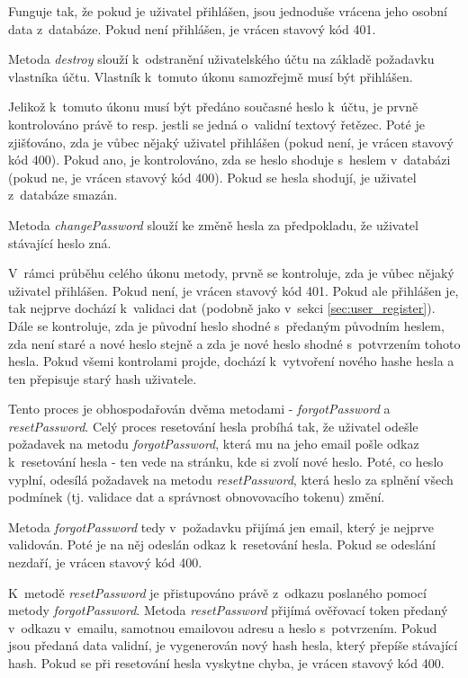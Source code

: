 			Funguje tak, že pokud je uživatel přihlášen, jsou jednoduše vrácena jeho osobní data z~databáze. Pokud není přihlášen, je vrácen stavový kód 401.
			
			\label{sec:user_destroy}
			Metoda \textit{destroy} slouží k~odstranění uživatelského účtu na základě požadavku vlastníka účtu. Vlastník k~tomuto úkonu samozřejmě musí být přihlášen.
			
			Jelikož k~tomuto úkonu musí být předáno současné heslo k~účtu, je prvně kontrolováno právě to resp. jestli se jedná o~validní textový řetězec. Poté je zjišťováno, zda je vůbec nějaký uživatel přihlášen (pokud není, je vrácen stavový kód 400). Pokud ano, je kontrolováno, zda se heslo shoduje s~heslem v~databázi (pokud ne, je vrácen stavový kód 400). Pokud se hesla shodují, je uživatel z~databáze smazán.
			
			\label{sec:user_changepassword}
			Metoda \textit{changePassword} slouží ke změně hesla za předpokladu, že uživatel stávající heslo zná.
			
			V~rámci průběhu celého úkonu metody, prvně se kontroluje, zda je vůbec nějaký uživatel přihlášen. Pokud není, je vrácen stavový kód 401. Pokud ale přihlášen je, tak nejprve dochází k~validaci dat (podobně jako v~sekci \ref{sec:user_register}). Dále se kontroluje, zda je původní heslo shodné s~předaným původním heslem, zda není staré a nové heslo stejně a zda je nové heslo shodné s~potvrzením tohoto hesla. Pokud všemi kontrolami projde, dochází k~vytvoření nového hashe hesla a ten přepisuje starý hash uživatele.
			
			 \label{sec:user_reset_forgot_password}
			Tento proces je obhospodařován dvěma metodami - \textit{forgotPassword} a \textit{resetPassword}. Celý proces resetování hesla probíhá tak, že uživatel odešle požadavek na metodu \textit{forgotPassword}, která mu na jeho email pošle odkaz k~resetování hesla - ten vede na stránku, kde si zvolí nové heslo. Poté, co heslo vyplní, odesílá požadavek na metodu \textit{resetPassword}, která heslo za splnění všech podmínek (tj. validace dat a správnost obnovovacího tokenu) změní. 
			
			Metoda \textit{forgotPassword} tedy v~požadavku přijímá jen email, který je nejprve validován. Poté je na něj odeslán odkaz k~resetování hesla. Pokud se odeslání nezdaří, je vrácen stavový kód 400.
			
			K~metodě \textit{resetPassword} je přistupováno právě z~odkazu poslaného pomocí metody \textit{forgotPassword}. Metoda \textit{resetPassword} přijímá ověřovací token předaný v~odkazu v~emailu, samotnou emailovou adresu a heslo s~potvrzením. Pokud jsou předaná data validní, je vygenerován nový hash hesla, který přepíše stávající hash. Pokud se při resetování hesla vyskytne chyba, je vrácen stavový kód 400.
			

